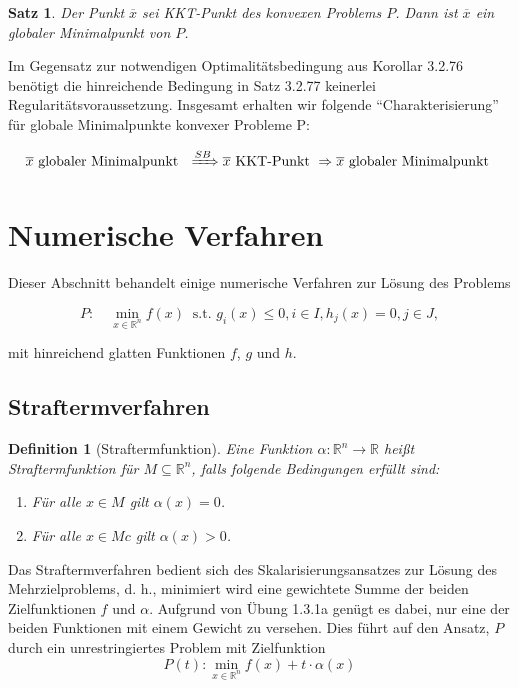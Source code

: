 \documentclass[11pt]{scrreprt}
\newcounter{thm}
\theoremstyle{thmstyle}
\numberwithin{thm}{section}
\newtheorem{definition}[thm]{Definition}
\newtheorem{satz}[thm]{Satz}
\begin{document}
\begin{satz}
	Der Punkt $\overline{x}$ sei KKT-Punkt des konvexen Problems $P$. Dann ist $\overline{x}$ ein globaler Minimalpunkt von $P$.
\end{satz}

Im Gegensatz zur notwendigen Optimalitätsbedingung aus Korollar 3.2.76 benötigt die hinreichende Bedingung in Satz 3.2.77 keinerlei Regularitätsvoraussetzung. Insgesamt erhalten wir folgende \enquote{Charakterisierung} für globale Minimalpunkte konvexer Probleme P:

	$$ \overline{x} \text{ globaler Minimalpunkt } \xRightarrow[]{SB} \overline{x} \text{ KKT-Punkt } \Rightarrow \overline{x} \text{ globaler Minimalpunkt } $$

\section*{Numerische Verfahren}

\setcounter{section}{3}
\setcounter{thm}{0}

Dieser Abschnitt behandelt einige numerische Verfahren zur Lösung des Problems

$$ P: \quad \min_{x \in \mathbb{R}^n} f(x) ~\text{ s.t. } g_i(x) \leq 0, i \in I, h_j(x) = 0, j \in J, $$

mit hinreichend glatten Funktionen $f$, $g$ und $h$.

\subsection*{Straftermverfahren}



\begin{definition}[Straftermfunktion]
	Eine Funktion $\alpha \colon \mathbb{R}^n \rightarrow \mathbb{R}$ heißt Straftermfunktion für $M \subseteq \mathbb{R}^n$, falls folgende Bedingungen erfüllt sind:
	\begin{enumerate}[label=\alph*\upshape)]
		\item Für alle $x \in M$ gilt $\alpha(x) = 0$.
		\item Für alle $x \in Mc$ gilt $\alpha(x) > 0$.
	\end{enumerate}	
\end{definition}

Das Straftermverfahren bedient sich des Skalarisierungsansatzes zur Lösung des Mehrzielproblems, d. h., minimiert wird eine gewichtete Summe der beiden Zielfunktionen $f$ und $\alpha$. Aufgrund von Übung 1.3.1a genügt es dabei, nur eine der beiden Funktionen mit einem Gewicht zu versehen. Dies führt auf den Ansatz, $P$ durch ein unrestringiertes Problem mit Zielfunktion
$$ P(t): \min_{x \in \mathbb{R}^n} f(x) + t \cdot \alpha(x) $$
\end{document}

